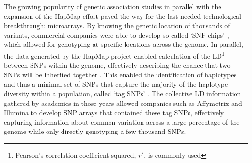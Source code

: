 The growing popularity of genetic association studies in parallel with the expansion of the HapMap effort paved the way for the last needed technological breakthrough: microarrays.
By knowing the genetic location of thousands of variants, commercial companies were able to develop so-called `SNP chips' \cite{meaburn2006genotyping, oliphant2002beadarray}, which allowed for genotyping at specific locations across the genome.
In parallel, the data generated by the HapMap project enabled calculation of the LD\footnote{Pearson's correlation coefficient squared, $r^2$, is commonly used} between SNPs within the genome, effectively describing the chance that two SNPs will be inherited together \cite{bush2012genome}.
This enabled the identification of haplotypes and thus a minimal set of SNPs that capture the majority of the haplotype diversity 
within a population, called `tag SNPs' \cite{international2003international}. 
The collective LD information gathered by academics in those years \cite{slatkin2008linkage, pe2006evaluating, otto2002resolving} allowed companies such as Affymetrix and Illumina to develop SNP arrays that contained 
these tag SNPs,
effectively capturing information about common variation 
across a large percentage of the genome while only directly genotyping a few thousand SNPs.\\


